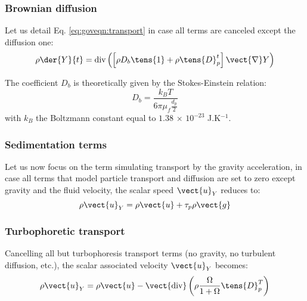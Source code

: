 \subsubsection{Brownian diffusion}
Let us detail Eq. \eqref{eq:goveqn:transport} in case all terms are canceled except the diffusion one:
\begin{equation}\label{eq:goveqn:diffusion}
  \rho\der{Y}{t} = \textrm{div}\left(\left[\rho D_b \tens{{1}} + \rho\tens{{D}}_p^t\right]\vect{\nabla}Y\right)
\end{equation}

The coefficient $D_b$ is theoretically given by the Stokes-Einstein relation:
\begin{equation}\label{eq:goveqn:db}
  D_b=\dfrac{k_BT}{6\pi\mu_f\frac{d_p}{2}}
\end{equation}
with $k_B$ the Boltzmann constant equal to $1.38\,\times\,10^{-23}$ J.K$^{-1}$.

\subsubsection{Sedimentation terms}\label{med:goveqn:sed}
Let us now focus on the term simulating transport by the gravity acceleration,
in case all terms that model particle transport and diffusion are set to zero except gravity and the
fluid velocity, the scalar speed $\vect{u}_Y$ reduces to:
\begin{equation}
 \rho \vect{u}_Y = \rho\vect{u} + \tau_p \rho \vect{g}
\end{equation}

\subsubsection{Turbophoretic transport}
Cancelling all but turbophoresis transport terms (no gravity, no turbulent diffusion, etc.), the scalar
associated velocity $\vect{u}_Y$ becomes:
\begin{equation}\label{eq:goveqn:turbophoresis}
 \rho \vect{u}_Y = \rho \vect{u} - \vect{\textrm{div}}\left(\rho\dfrac{\Omega}{1+\Omega}\tens{{D}}_p^T\right)
\end{equation}

